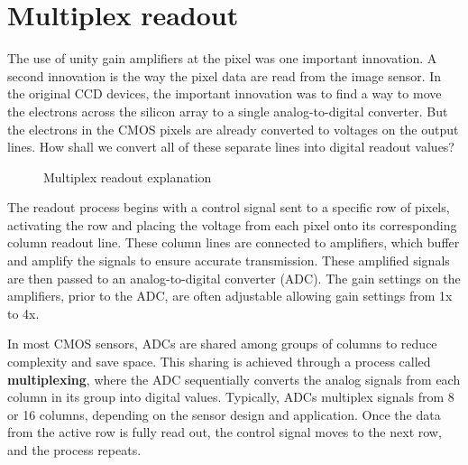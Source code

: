 \documentclass[
  letterpaper,
]{book}
\begin{document}
\section{Multiplex readout}\label{multiplex-readout}

The use of unity gain amplifiers at the pixel was one important
innovation. A second innovation is the way the pixel data are read from
the image sensor. In the original CCD devices, the important innovation
was to find a way to move the electrons across the silicon array to a
single analog-to-digital converter. But the electrons in the CMOS pixels
are already converted to voltages on the output lines. How shall we
convert all of these separate lines into digital readout values?

\begin{figure}


\caption{\label{fig-cmos-multiplex}Multiplex readout explanation}

\end{figure}%

The readout process begins with a control signal sent to a specific row
of pixels, activating the row and placing the voltage from each pixel
onto its corresponding column readout line. These column lines are
connected to amplifiers, which buffer and amplify the signals to ensure
accurate transmission. These amplified signals are then passed to an
analog-to-digital converter (ADC). The gain settings on the amplifiers,
prior to the ADC, are often adjustable allowing gain settings from 1x to
4x.

In most CMOS sensors, ADCs are shared among groups of columns to reduce
complexity and save space. This sharing is achieved through a process
called \textbf{multiplexing}, where the ADC sequentially converts the
analog signals from each column in its group into digital values.
Typically, ADCs multiplex signals from 8 or 16 columns, depending on the
sensor design and application. Once the data from the active row is
fully read out, the control signal moves to the next row, and the
process repeats.
\end{document}
